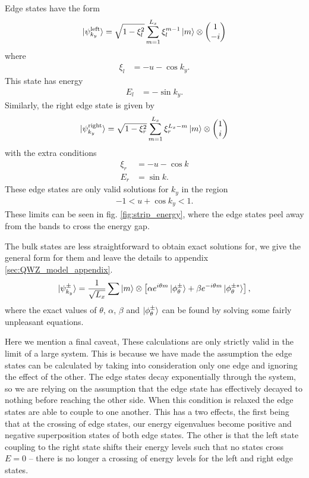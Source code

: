 Edge states have the form
\begin{align}
    \ket{\psi^{\textup{left}}_{k_y}} = \sqrt{1-\xi_l^2}\sum_{m=1}^{L_x} \xi_l^{m-1}\ket m \otimes \begin{pmatrix}
    1\\
    -i
    \end{pmatrix}
\end{align}
where 
\begin{align}
    \xi_l &= -u - \cos k_y.
\end{align}
This state has energy
\begin{align}
    E_l &= -\sin k_y.
\end{align}
Similarly, the right edge state is given by
\begin{align}
    \ket {\psi^{\textup{right}}_{k_y}} = \sqrt{1-\xi_r^2} \sum_{m=1}^{L_x} \xi_r^{L_x-m} \ket m \otimes  \begin{pmatrix}
    1\\
    i
    \end{pmatrix}
\end{align}
with the extra conditions
\begin{align}
   	 \xi_r &= -u-\cos k \label{eqn:edge_condition}\\
	E_r &= \sin k.
\end{align}
These edge states are only valid solutions for $k_y$ in the region
\begin{align}
	-1 < u+\cos k_y < 1.
\end{align}
These limits can be seen in fig. \ref{fig:strip_energy}, where the edge states peel away from the bands to cross the energy gap.\par
The bulk states are less straightforward to obtain exact solutions for, we give the general form for them and leave the details to appendix \ref{sec:QWZ_model_appendix}.
\begin{align}
    \ket{\psi^\pm_{k_y} }= \frac{1}{\sqrt{L_x}}\sum \ket{m}  \otimes \left [ \alpha e^{i \theta m} \ket{\phi_{\theta}^{\pm}} + \beta e^{-i \theta m} \ket{\phi_{\theta}^{\pm *}} \right ],
\end{align}
where the exact values of $\theta$, $\alpha$, $\beta$ and $\ket{\phi_{\theta}^{\pm}} $ can be found by solving some fairly unpleasant equations.\par
Here we mention a final caveat, These calculations are only strictly valid in the limit of a large system. This is because we have made the assumption the edge states can be calculated by taking into consideration only one edge and ignoring the effect of the other. The edge states decay exponentially through the system, so we are relying on the assumption that the edge state has effectively decayed to nothing before reaching the other side. When this condition is relaxed the edge states are able to couple to one another. This has a two effects, the first being that at the crossing of edge states, our energy eigenvalues become positive and negative superposition states of both edge states. The other is that the left state coupling to the right state shifts their energy levels such that no states cross $E = 0$ -- there is no longer a crossing of energy levels for the left and right edge states.






